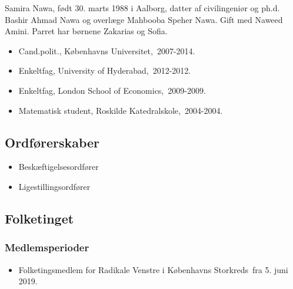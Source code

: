 \documentclass[11pt, a4paper]{awesome-cv}
\begin{document}
\makecvheader[R]
\makelettertitle
\begin{cvletter}
Samira Nawa, født 30. marts 1988 i Aalborg, datter af civilingeniør og ph.d. Bashir Ahmad Nawa og overlæge Mahbooba Speher Nawa. Gift med Naweed Amini. Parret har børnene Zakarias og Sofia.

\begin{itemize}
\item Cand.polit., Københavns Universitet, 2007-2014.
\item Enkeltfag, University of Hyderabad, 2012-2012.
\item Enkeltfag, London School of Economics, 2009-2009.
\item Matematisk student, Roskilde Katedralskole, 2004-2004.
\end{itemize}
\subsection*{Ordførerskaber}
\begin{itemize}
\item Beskæftigelsesordfører
\item Ligestillingsordfører
\end{itemize}
\subsection*{Folketinget}
\subsubsection*{Medlemsperioder}
\begin{itemize}
\item Folketingsmedlem for Radikale Venstre i Københavns Storkreds fra 5. juni 2019.
\end{itemize}

\end{cvletter}
\end{document}

